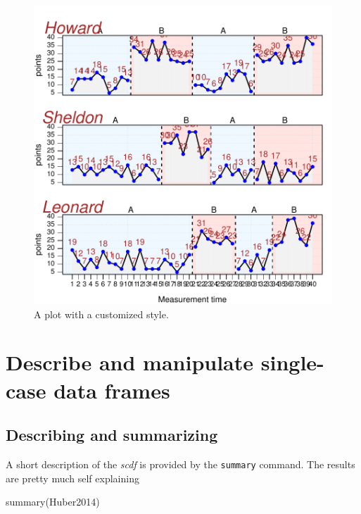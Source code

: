 \documentclass[
  letterpaper,
  DIV=11,
  numbers=noendperiod]{scrreprt}
\newenvironment{Shaded}{\begin{snugshade}}{\end{snugshade}}
\newcommand{\FunctionTok}[1]{\textcolor[rgb]{0.28,0.35,0.67}{#1}}
\newcommand{\NormalTok}[1]{\textcolor[rgb]{0.00,0.23,0.31}{#1}}
\begin{document}
\begin{figure}[H]

{\centering \includegraphics{./ch_creating_a_plot_files/figure-pdf/custom_style_example-1.pdf}

}

\caption{A plot with a customized style.}

\end{figure}

\hypertarget{describe-and-manipulate-single-case-data-frames}{%
\chapter{Describe and manipulate single-case data
frames}\label{describe-and-manipulate-single-case-data-frames}}

\hypertarget{describing-and-summarizing}{%
\section{Describing and summarizing}\label{describing-and-summarizing}}

A short description of the \emph{scdf} is provided by the
\texttt{summary} command. The results are pretty much self explaining

\begin{Shaded}
\begin{Highlighting}[]
\FunctionTok{summary}\NormalTok{(Huber2014)}
\end{Highlighting}
\end{Shaded}
\end{document}
